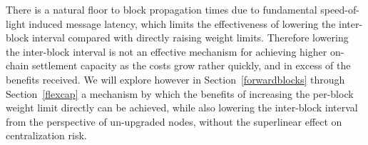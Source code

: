 There is a natural floor to block propagation times due to fundamental
speed-of-light induced message latency, which limits the effectiveness
of lowering the inter-block interval compared with directly raising
weight limits.  Therefore lowering the inter-block interval is not an
effective mechanism for achieving higher on-chain settlement capacity
as the costs grow rather quickly, and in excess of the benefits
received.  We will explore however in Section~\ref{forwardblocks}
through Section~\ref{flexcap} a mechanism by which the benefits of
increasing the per-block weight limit directly can be achieved, while
also lowering the inter-block interval from the perspective of
un-upgraded nodes, without the superlinear effect on centralization
risk.
